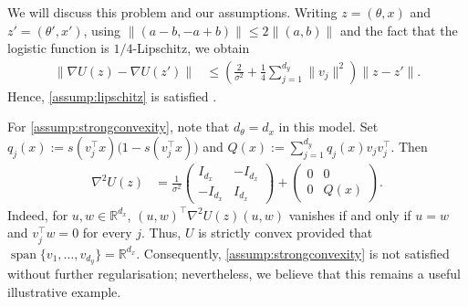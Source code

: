 \begin{remark}\label{rem:convexity}

We will discuss this problem and our assumptions. Writing $z=(\theta,x)$ and $z'=(\theta',x')$, using
$\|(a-b,-a+b)\|\leq2\|(a,b)\|$ and the fact that the logistic function is $1/4$-Lipschitz, we obtain
\begin{equation*}
\begin{aligned}
\|\nabla U(z)-\nabla U(z')\|
&\leq\left(\frac{2}{\sigma^2}+\frac14\sum_{j=1}^{d_y}\|v_j\|^2\right)\|z-z'\|.
\end{aligned}
\end{equation*}
Hence, \ref{assump:lipschitz} is satisfied \citep{akyildiz2025interacting}.

For \ref{assump:strongconvexity}, note that $d_\theta=d_x$ in this model. Set
$q_j(x):=s(v_j^\intercal x)\bigl(1-s(v_j^\intercal x)\bigr)$ and
$Q(x):=\sum_{j=1}^{d_y}q_j(x)v_jv_j^\intercal$. Then
\begin{equation*}
\begin{aligned}
\nabla^2U(z)
&=\frac1{\sigma^2}
\begin{pmatrix}
I_{d_x}&-I_{d_x}\\
-I_{d_x}&I_{d_x}
\end{pmatrix} +\begin{pmatrix}
0&0\\
0&Q(x)
\end{pmatrix}.
\end{aligned}
\end{equation*}
Indeed, for $u,w\in\mathbb R^{d_x}$, $(u, w)^\intercal\nabla^2U(z)(u,w)$ vanishes if and only if $u=w$ and $v_j^\intercal w=0$ for every $j$.
Thus, $U$ is strictly convex provided that
$\operatorname{span}\{v_1,\ldots,v_{d_y}\}=\mathbb R^{d_x}$. Consequently, \ref{assump:strongconvexity} is not satisfied without further regularisation; nevertheless, we believe that this remains a useful illustrative example.
\end{remark}

